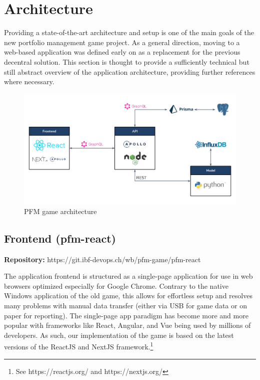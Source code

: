 \section{Architecture}
\label{sec:architecture}

Providing a state-of-the-art architecture and setup is one of the main goals of the new portfolio management game project. As a general direction, moving to a web-based application was defined early on as a replacement for the previous decentral solution. This section is thought to provide a sufficiently technical but still abstract overview of the application architecture, providing further references where necessary.

\begin{figure}[h!]
  \centering
  \includegraphics[scale=0.45]{img/architecture.png}
  \caption{PFM game architecture}
\end{figure}


\subsection{Frontend (pfm-react)}
\begin{flushright}
  \textbf{Repository:} https://git.ibf-devops.ch/wb/pfm-game/pfm-react
\end{flushright}

The application frontend is structured as a single-page application for use in web browsers optimized especially for Google Chrome. Contrary to the native Windows application of the old game, this allows for effortless setup and resolves many problems with manual data transfer (either via USB for game data or on paper for reporting). The single-page app paradigm has become more and more popular with frameworks like React, Angular, and Vue being used by millions of developers. As such, our implementation of the game is based on the latest versions of the ReactJS and NextJS framework.\footnote{See https://reactjs.org/ and https://nextjs.org/}


